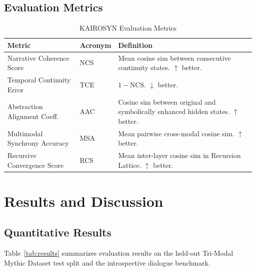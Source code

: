 \documentclass[conference]{IEEEtran}
\begin{document}
\subsection{Evaluation Metrics}

\begin{table}[h]
\centering
\caption{KAIROSYN Evaluation Metrics}
\label{tab:metrics}
\begin{tabular}{llp{4.5cm}}
\toprule
\textbf{Metric} & \textbf{Acronym} & \textbf{Definition} \\
\midrule
Narrative Coherence Score     & NCS & Mean cosine sim between consecutive
                                       continuity states. $\uparrow$ better. \\
Temporal Continuity Error     & TCE & $1 - \text{NCS}$.
                                       $\downarrow$ better. \\
Abstraction Alignment Coeff.  & AAC & Cosine sim between original and
                                       symbolically enhanced hidden states.
                                       $\uparrow$ better. \\
Multimodal Synchrony Accuracy & MSA & Mean pairwise cross-modal cosine sim.
                                       $\uparrow$ better. \\
Recursive Convergence Score   & RCS & Mean inter-layer cosine sim in
                                       Recursion Lattice. $\uparrow$ better. \\
\bottomrule
\end{tabular}
\end{table}


\section{Results and Discussion}

\subsection{Quantitative Results}

Table~\ref{tab:results} summarizes evaluation results on the held-out
Tri-Modal Mythic Dataset test split and the introspective dialogue benchmark.
\end{document}

